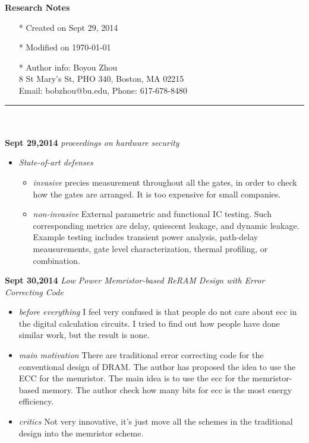 \documentclass[]{article}
\begin{document}
\pagestyle{empty}
{\large\textbf{Research Notes}}
\begin{itemize}
    \item[*] Created on Sept 29, 2014
    \item[*] Modified on \today
    \item[*] Author info: Boyou Zhou\\
             8 St Mary's St, PHO 340, Boston, MA 02215\\
             Email: bobzhou@bu.edu, Phone: 617-678-8480
\end{itemize}


\rule[-0.1cm]{7.5in}{0.01cm}\\
\\
\noindent \textbf{Sept 29,2014}
\textit{proceedings on hardware security}
\indent		\begin{itemize}

            \item \textit{State-of-art defenses} 
                \begin{itemize}

                    \item \textit{invasive} precies measurement throughout all the gates, in order to check
                    how the gates are arranged. It is too expensive for small companies.

                    \item \textit{non-invasive} External parametric and functional IC testing. Such corresponding
                    metrics are delay, quiescent leakage, and dynamic leakage.
                    Example testing includes transient power analysis, path-delay meausurements, gate level
                    characterization, thermal profiling, or combination.

                \end{itemize}
        \end{itemize}

\noindent \textbf{Sept 30,2014}
\textit{Low Power Memristor-based ReRAM Design with Error Correcting Code }
\indent		\begin{itemize}
            \item \textit{before everything} I feel very confused is that people do not care about ecc in the 
            digital calculation circuits. I tried to find out how people have done similar work, but the result
            is none.
            \item \textit{main motivation} There are traditional error correcting code for the conventional design
            of DRAM. The author has proposed the idea to use the ECC for the memristor.
            The main idea is to use the ecc for the memristor-based memory. The author check how many bits for ecc
            is the most energy efficiency.

            \item \textit{critics} Not very innovative, it's just move all the schemes in the traditional design 
            into the memristor scheme.
        \end{itemize}
\end{document}
